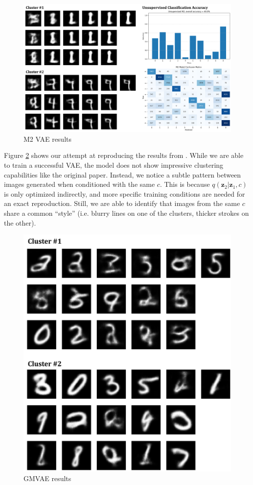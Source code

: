 \begin{figure}[h]
    \centering
    \includegraphics[width=0.9\linewidth]{figures/m2model.png}
    \caption{M2 VAE results}
    \label{fig:m2model}
\end{figure}

Figure \ref{fig:gmvae} shows our attempt at reproducing the results from \cite{gmvae}. While we are able to train a successful VAE, the model does not show impressive clustering capabilities like the original paper. Instead, we notice a subtle pattern between images generated when conditioned with the same $c$. This is because $q(\mathbf{z}_2|\mathbf{z}_1,c)$ is only optimized indirectly, and more specific training conditions are needed for an exact reproduction. Still, we are able to identify that images from the same $c$ share a common ``style'' (i.e. blurry lines on one of the clusters, thicker strokes on the other).

\begin{figure}[h]
    \centering
    \includegraphics[width=0.9\linewidth]{figures/gmvae.png}
    \caption{GMVAE results}
    \label{fig:gmvae}
\end{figure}